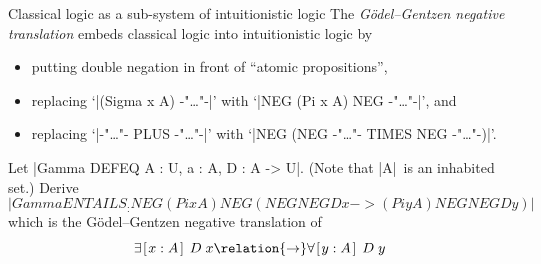 \documentclass[t,compress,hyperref={hidelinks}]{beamer}
\begin{document}
\begin{frame}{Classical logic as a sub-system of intuitionistic logic}
The \emph{Gödel--Gentzen negative translation} embeds classical logic into intuitionistic logic by
\begin{itemize}
\item putting double negation in front of ``atomic propositions'',
\item replacing `|(Sigma x A) {-"\text\ldots"-}|' with `|NEG (Pi x A) NEG {-"\kern3pt\text\ldots"-}|', and
\item replacing `|{-"\text\ldots\kern1pt"-} PLUS {-"\kern2pt\text\ldots"-}|' with `|NEG (NEG {-"\text\ldots\kern1pt"-} TIMES NEG {-"\kern3pt\text\ldots"-})|'.
\end{itemize}

 Let |Gamma DEFEQ A : U, a : A, D : A -> U|. (Note that |A|~is an inhabited set.) Derive
\[ |Gamma ENTAILS _ : NEG (Pi x A) NEG (NEG NEG D x -> (Pi y A) NEG NEG D y)| \]
which is the Gödel--Gentzen negative translation of
\[ \exists\kern1pt[\kern1pt x : A \kern1.25pt]\kern1.5pt\; D\;x \relation{\to} \forall\kern1pt[\kern1pt y : A \kern1.25pt]\kern1.5pt\; D\;y \]

\end{frame}
\end{document}

